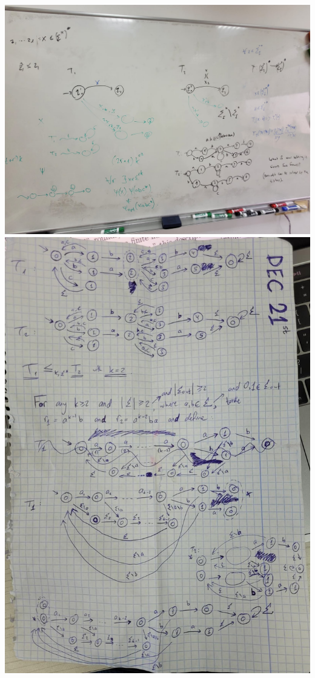 \includegraphics[width=\linewidth]{graphics/wb6.jpg}
\includegraphics[width=\linewidth]{graphics/dec21.jpeg}
